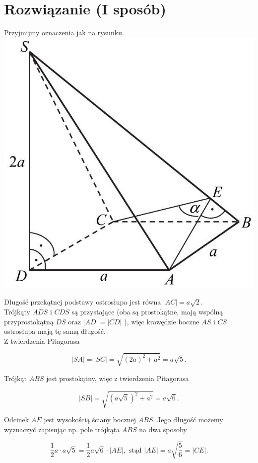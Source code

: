 \documentclass[10pt]{article}
\begin{document}
\section*{Rozwiązanie (I sposób)}
Przyjmijmy oznaczenia jak na rysunku.\\
\includegraphics[max width=\textwidth, center]{2025_02_07_f5f4e8f37e6baab02e47g-22}

Długość przekątnej podstawy ostrosłupa jest równa $|A C|=a \sqrt{2}$.\\
Trójkąty $A D S$ i $C D S$ są przystające (oba są prostokątne, mają wspólną przyprostokątną $D S$ oraz $|A D|=|C D|$ ), więc krawędzie boczne $A S$ i $C S$ ostrosłupa mają tę samą długość.\\
Z twierdzenia Pitagorasa

$$
|S A|=|S C|=\sqrt{(2 a)^{2}+a^{2}}=a \sqrt{5} .
$$

Trójkąt $A B S$ jest prostokątny, więc z twierdzenia Pitagorasa

$$
|S B|=\sqrt{(a \sqrt{5})^{2}+a^{2}}=a \sqrt{6} .
$$

Odcinek $A E$ jest wysokością ściany bocznej $A B S$. Jego długość możemy wyznaczyć zapisując np. pole trójkąta $A B S$ na dwa sposoby

$$
\frac{1}{2} a \cdot a \sqrt{5}=\frac{1}{2} a \sqrt{6} \cdot|A E|, \text { stąd }|A E|=a \sqrt{\frac{5}{6}}=|C E| .
$$
\end{document}
